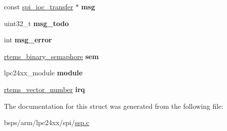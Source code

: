 \begin{DoxyCompactItemize}
const \mbox{\hyperlink{structspi__ioc__transfer}{spi\+\_\+ioc\+\_\+transfer}} $\ast$ {\bfseries msg}
\item 
\mbox{\label{structlpc24xx__ssp__bus_a3e458cb39342e66ceca6f214f13f420c}} 
uint32\+\_\+t {\bfseries msg\+\_\+todo}
\item 
\mbox{\label{structlpc24xx__ssp__bus_a8e23e880e0e689b65cdff3b911cbd86f}} 
int {\bfseries msg\+\_\+error}
\item 
\mbox{\label{structlpc24xx__ssp__bus_a6d0099a686d9c9ea710620a1e27c908e}} 
\mbox{\hyperlink{structrtems__binary__semaphore}{rtems\+\_\+binary\+\_\+semaphore}} {\bfseries sem}
\item 
\mbox{\label{structlpc24xx__ssp__bus_adc807b56fc425f6ccd3ca7d9a130eebd}} 
lpc24xx\+\_\+module {\bfseries module}
\item 
\mbox{\label{structlpc24xx__ssp__bus_a7b3ae9330092cb3b644dc23db174b65d}} 
\mbox{\hyperlink{group__ClassicINTR_ga3e434c197d99f128e78cae4d9358bd8b}{rtems\+\_\+vector\+\_\+number}} {\bfseries irq}
\end{DoxyCompactItemize}


The documentation for this struct was generated from the following file\+:\begin{DoxyCompactItemize}
\item 
bsps/arm/lpc24xx/spi/\mbox{\hyperlink{ssp_8c}{ssp.\+c}}\end{DoxyCompactItemize}
